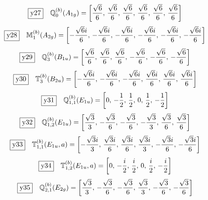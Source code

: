 \documentclass[fleqn,10pt,landscape]{jsarticle}
\begin{document}
\begin{dmath*}
\fbox{y27}\quad \mathbb{Q}_{0}^{(b)}(A_{1g})=\left[ \frac{\sqrt{6}}{6},\, \frac{\sqrt{6}}{6},\, \frac{\sqrt{6}}{6},\, \frac{\sqrt{6}}{6},\, \frac{\sqrt{6}}{6},\, \frac{\sqrt{6}}{6} \right]
\end{dmath*}
\begin{dmath*}
\fbox{y28}\quad \mathbb{M}_{1}^{(b)}(A_{2g})=\left[ - \frac{\sqrt{6} i}{6},\, - \frac{\sqrt{6} i}{6},\, - \frac{\sqrt{6} i}{6},\, - \frac{\sqrt{6} i}{6},\, - \frac{\sqrt{6} i}{6},\, - \frac{\sqrt{6} i}{6} \right]
\end{dmath*}
\begin{dmath*}
\fbox{y29}\quad \mathbb{Q}_{3}^{(b)}(B_{1u})=\left[ \frac{\sqrt{6}}{6},\, \frac{\sqrt{6}}{6},\, \frac{\sqrt{6}}{6},\, - \frac{\sqrt{6}}{6},\, - \frac{\sqrt{6}}{6},\, - \frac{\sqrt{6}}{6} \right]
\end{dmath*}
\begin{dmath*}
\fbox{y30}\quad \mathbb{T}_{3}^{(b)}(B_{2u})=\left[ - \frac{\sqrt{6} i}{6},\, - \frac{\sqrt{6} i}{6},\, - \frac{\sqrt{6} i}{6},\, \frac{\sqrt{6} i}{6},\, \frac{\sqrt{6} i}{6},\, \frac{\sqrt{6} i}{6} \right]
\end{dmath*}
\begin{dmath*}
\fbox{y31}\quad \mathbb{Q}_{1,1}^{(b)}(E_{1u})=\left[ 0,\, - \frac{1}{2},\, \frac{1}{2},\, 0,\, \frac{1}{2},\, - \frac{1}{2} \right]
\end{dmath*}
\begin{dmath*}
\fbox{y32}\quad \mathbb{Q}_{1,2}^{(b)}(E_{1u})=\left[ \frac{\sqrt{3}}{3},\, - \frac{\sqrt{3}}{6},\, - \frac{\sqrt{3}}{6},\, - \frac{\sqrt{3}}{3},\, \frac{\sqrt{3}}{6},\, \frac{\sqrt{3}}{6} \right]
\end{dmath*}
\begin{dmath*}
\fbox{y33}\quad \mathbb{T}_{1,1}^{(b)}(E_{1u},a)=\left[ - \frac{\sqrt{3} i}{3},\, \frac{\sqrt{3} i}{6},\, \frac{\sqrt{3} i}{6},\, \frac{\sqrt{3} i}{3},\, - \frac{\sqrt{3} i}{6},\, - \frac{\sqrt{3} i}{6} \right]
\end{dmath*}
\begin{dmath*}
\fbox{y34}\quad \mathbb{T}_{1,2}^{(b)}(E_{1u},a)=\left[ 0,\, - \frac{i}{2},\, \frac{i}{2},\, 0,\, \frac{i}{2},\, - \frac{i}{2} \right]
\end{dmath*}
\begin{dmath*}
\fbox{y35}\quad \mathbb{Q}_{2,1}^{(b)}(E_{2g})=\left[ \frac{\sqrt{3}}{3},\, - \frac{\sqrt{3}}{6},\, - \frac{\sqrt{3}}{6},\, \frac{\sqrt{3}}{3},\, - \frac{\sqrt{3}}{6},\, - \frac{\sqrt{3}}{6} \right]
\end{dmath*}
\end{document}
